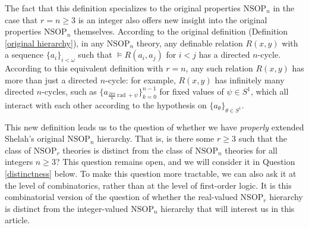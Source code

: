 \documentclass{amsart}
\theoremstyle{definition}
\theoremstyle{remark}
\numberwithin{equation}{section}
\begin{document}
The fact that this definition specializes to the original properties $\mathrm{NSOP}_{n}$ in the case that $r = n \geq 3$ is an integer also offers new insight into the original properties $\mathrm{NSOP}_{n}$ themselves. According to the original definition (Definition \ref{original hierarchy}), in any $\mathrm{NSOP}_{n}$ theory, any definable relation $R(x, y)$ with a sequence $\{a_{i}\}_{i < \omega}$ such that $\models R(a_{i}, a_{j})$ for $i <j$ has a directed $n$-cycle. According to this equivalent definition with $r=n$, any such relation $R(x, y)$ has more than just a directed $n$-cycle: for example, $R(x,y)$ has infinitely many directed $n$-cycles, such as $\{a_{\frac{2k\pi}{n} \mathrm{\: rad \:}+ \psi}\}^{n-1}_{k=0}$ for fixed values of $\psi \in S^{1}$, which all interact with each other according to the hypothesis on $\{a_{\theta}\}_{\theta \in S^{1}}$.

This new definition leads us to the question of whether we have \textit{properly} extended Shelah's original $\mathrm{NSOP}_{n}$ hierarchy. That is, is there some $r \geq 3$ such that the class of $\mathrm{NSOP}_{r}$ theories is distinct from the class of $\mathrm{NSOP}_{n}$ theories for all integers $n \geq 3$? This question remains open, and we will consider it in Question \ref{distinctness} below. To make this question more tractable, we can also ask it at the level of combinatorics, rather than at the level of first-order logic. It is this combinatorial version of the question of whether the real-valued $\mathrm{NSOP}_{r}$ hierarchy is distinct from the integer-valued $\mathrm{NSOP}_{n}$ hierarchy that will interest us in this article.
\end{document}
